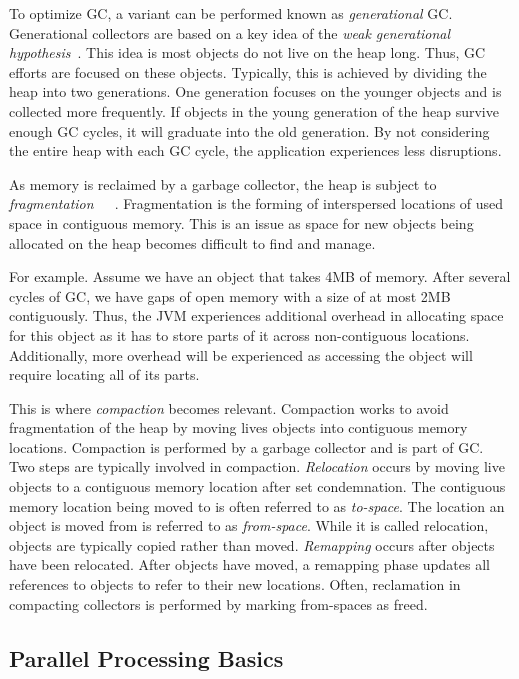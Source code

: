 \documentclass{sig-alternate}
\begin{document}
To optimize GC, a variant can be performed known as \emph{generational} GC.
Generational collectors are based on a key idea of the \emph{weak generational hypothesis}~\cite{Tene:C4}.
This idea is most objects do not live on the 
heap long. Thus, GC efforts are focused on these objects. Typically, this is achieved
by dividing the heap into two generations. One generation focuses on the younger objects and
is collected more frequently. If objects in the young generation of the heap survive
enough GC cycles, it will graduate into the old generation. By not considering the entire
heap with each GC cycle, the application experiences less disruptions.

As memory is reclaimed by a garbage collector, the heap is subject to 
\emph{fragmentation}~\cite{Tene:C4}~\cite{Iyengar:Collie}~\cite{Osterlund:FPP}. Fragmentation is the forming
of interspersed locations of used space in contiguous memory. This
is an issue as space for new objects being allocated
on the heap becomes difficult to find and manage. 

For example. Assume
we have an object that takes 4MB of memory. After several cycles of GC,
we have gaps of open memory with a size of at most 2MB contiguously. Thus, 
the JVM experiences additional overhead in allocating space for this object
as it has to store parts of it across non-contiguous locations. Additionally,
more overhead will be experienced as accessing the object will require locating
all of its parts.

This is where \emph{compaction} becomes relevant. Compaction works to avoid
fragmentation of the heap by moving lives objects into contiguous memory locations.
Compaction is performed by a garbage collector and is part of GC. Two steps
are typically involved in compaction. \emph{Relocation} occurs by moving live objects
to a contiguous memory location after set condemnation.
The contiguous memory location being moved to is often referred to as \emph{to-space}.
The location an object is moved from is referred to as \emph{from-space}. While it is called 
relocation, objects are typically copied rather than moved. \emph{Remapping}
occurs after objects have been relocated. After objects have moved, a remapping phase 
updates all references to objects to refer to their new locations. Often, reclamation
in compacting collectors is performed by marking from-spaces as freed.


\subsection{Parallel Processing Basics}
\label{sec:parallelProcessing}
\end{document}
